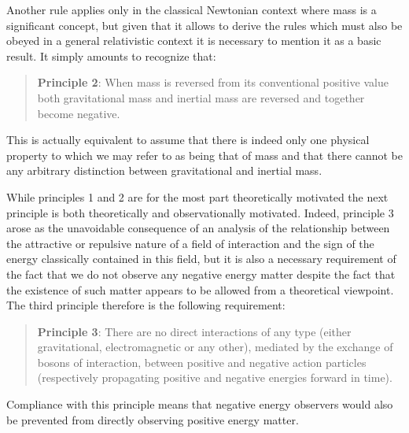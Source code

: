 \documentclass[notitlepage,12pt]{report}
\begin{document}
Another rule applies only in the classical Newtonian context where mass is a significant concept, but given that it allows to derive the rules which must also be obeyed in a general relativistic context it is necessary to mention it as a basic result. It simply amounts to recognize that:
\begin{quote}
\textbf{Principle 2}: When mass is reversed from its conventional positive value both gravitational mass and inertial mass are reversed and together become negative.
\end{quote}
This is actually equivalent to assume that there is indeed only one physical property to which we may refer to as being that of mass and that there cannot be any arbitrary distinction between gravitational and inertial mass.

While principles 1 and 2 are for the most part theoretically motivated the next principle is both theoretically and observationally motivated. Indeed, principle 3 arose as the unavoidable consequence of an analysis of the relationship between the attractive or repulsive nature of a field of interaction and the sign of the energy classically contained in this field, but it is also a necessary requirement of the fact that we do not observe any negative energy matter despite the fact that the existence of such matter appears to be allowed from a theoretical viewpoint. The third principle therefore is the following requirement:
\begin{quote}
\textbf{Principle 3}: There are no direct interactions of any type (either gravitational, electromagnetic or any other), mediated by the exchange of bosons of interaction, between positive and negative action particles (respectively propagating positive and negative energies forward in time).
\end{quote}
Compliance with this principle means that negative energy observers would also be prevented from directly observing positive energy matter.
\end{document}

